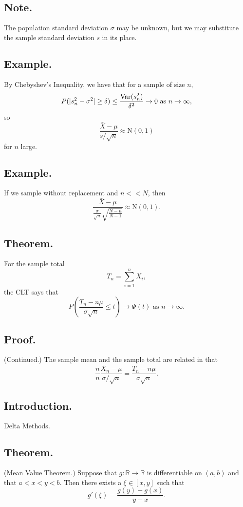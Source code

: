 \documentclass[titlepage]{article}
\begin{document}
\subsection{Note.} The population standard deviation $\sigma$ may be unknown, but we may substitute the sample standard deviation $s$ in its place.

\subsection{Example.} By Chebyshev's Inequality, we have that for a sample of size $n$, 
$$P(|s_{n}^{2} - \sigma^{2}| \geq \delta) \leq \frac{\text{Var}(s_{n}^{2})}{\delta^{2}} \rightarrow 0 \text{ as } n \rightarrow \infty,$$
so 
$$\frac{\bar{X} - \mu}{s/\sqrt{n}} \approx \text{N}(0, 1)$$
for $n$ large.

\subsection{Example.} If we sample without replacement and $n << N$, then 
$$\frac{\bar{X} - \mu}{\frac{\sigma}{\sqrt{n}}\sqrt{\frac{N-n}{N-1}}} \approx \text{N}(0, 1).$$

\subsection{Theorem.} For the sample total 
$$T_{n} = \sum_{i=1}^{n}X_{i},$$
the CLT says that 
$$P\left(\frac{T_{n} - n\mu}{\sigma\sqrt{n}} \leq t\right) \rightarrow \Phi(t) \text{ as } n \rightarrow \infty.$$

\subsection{Proof.} (Continued.) The sample mean and the sample total are related in that 
$$\frac{n}{n}\frac{\bar{X}_{n}-\mu}{\sigma/\sqrt{n}} = \frac{T_{n}-n\mu}{\sigma\sqrt{n}}.$$

\newpage {}

\subsection{Introduction.} Delta Methods.

\subsection{Theorem.} (Mean Value Theorem.) Suppose that $g: \mathbb{R} \to \mathbb{R}$ is differentiable on $(a, b)$ and that $a < x < y < b$. Then there exists a $\xi \in [x, y]$ such that 
$$g'(\xi) = \frac{g(y) - g(x)}{y - x}.$$
\end{document}
